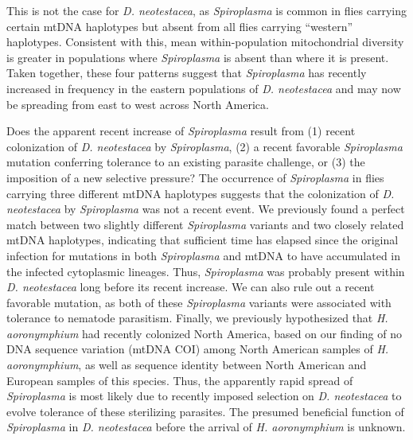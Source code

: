 \documentclass[11pt]{article}
\begin{document}
\begin{sloppypar}
This is not the case for \textit{D. neotestacea}, as \textit{Spiroplasma} is common in flies carrying certain mtDNA haplotypes but absent from all flies carrying “western” haplotypes. 
Consistent with this, mean within-population mitochondrial diversity is greater in populations where \textit{Spiroplasma} is absent than where it is present. 
Taken together, these four patterns suggest that \textit{Spiroplasma} has recently increased in frequency in the eastern populations of \textit{D. neotestacea} and may now be spreading from east to west across North America. 
\par
Does the apparent recent increase of \textit{Spiroplasma} result from 
(1) recent colonization of \textit{D. neotestacea} by \textit{Spiroplasma}, 
(2) a recent favorable \textit{Spiroplasma} mutation conferring tolerance to an existing parasite challenge, or 
(3) the imposition of a new selective pressure? 
The occurrence of \textit{Spiroplasma} in flies carrying three different mtDNA haplotypes suggests that the colonization of \textit{D. neotestacea} by \textit{Spiroplasma} was not a recent event. 
We previously found a perfect match between two slightly different \textit{Spiroplasma} variants and two closely related mtDNA haplotypes, indicating that sufficient time has elapsed since the original infection for mutations in both \textit{Spiroplasma} and mtDNA to have accumulated in the infected cytoplasmic lineages. 
Thus, \textit{Spiroplasma} was probably present within \textit{D. neotestacea} long before its recent increase. 
We can also rule out a recent favorable mutation, as both of these \textit{Spiroplasma} variants were associated with tolerance to nematode parasitism. 
Finally, we previously hypothesized that \textit{H. aoronymphium} had recently colonized North America, based on our finding of no DNA sequence variation (mtDNA COI) among North American samples of \textit{H. aoronymphium}, as well as sequence identity between North American and European samples of this species. 
Thus, the apparently rapid spread of \textit{Spiroplasma} is most likely due to recently imposed selection on \textit{D. neotestacea} to evolve tolerance of these sterilizing parasites. 
The presumed beneficial function of \textit{Spiroplasma} in \textit{D. neotestacea} before the arrival of \textit{H. aoronymphium} is unknown.

\end{sloppypar}
\end{document}
